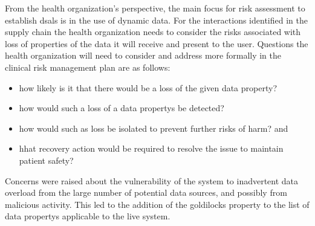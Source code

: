 \begin{minipage}[t]{0.73\textwidth}
  From the health organization's perspective, the main focus for risk assessment to establish \glspl{dsal} is in the use of dynamic data. For the interactions identified in the supply chain the health organization needs to consider the risks associated with loss of properties of the data it will receive and present to the user. Questions the health organization will need to consider and address more formally in the clinical risk management plan are as follows:
\end{minipage}
\begin{minipage}[t]{0.25\textwidth}
  \centering{}
\end{minipage}

\begin{itemize}
  \item how likely is it that there would be a loss of the given \gls{data property}?
  \item how would such a loss of a \glspl{data property} be detected?
  \item how would such as loss be isolated to prevent further risks of harm? and
  \item hhat recovery action would be required to resolve the issue to maintain patient safety?
\end{itemize}

Concerns were raised about the vulnerability of the system to inadvertent data overload from the large number of potential data sources, and possibly from malicious activity. This led to the addition of the \gls{goldilocks} property to the list of \glspl{data property} applicable to the live system.

